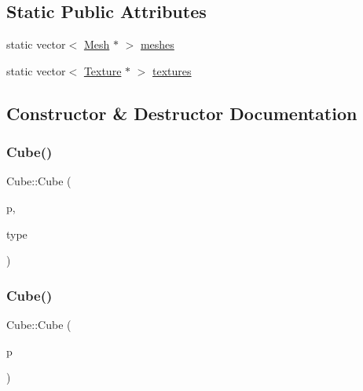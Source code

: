 \subsection*{Static Public Attributes}
\begin{DoxyCompactItemize}
\item 
static vector$<$ \mbox{\hyperlink{structMesh}{Mesh}} $\ast$ $>$ \mbox{\hyperlink{classCube_a4470b28c7fff28dd9058ea96307c1000}{meshes}}
\item 
static vector$<$ \mbox{\hyperlink{classTexture}{Texture}} $\ast$ $>$ \mbox{\hyperlink{classCube_a7c3516e41ce365ccad2d9bb9ed81ff10}{textures}}
\end{DoxyCompactItemize}


\subsection{Constructor \& Destructor Documentation}
\mbox{\label{classCube_a1609058c502ef5aa5d162809d156826b}} 
\subsubsection{\texorpdfstring{Cube()}{Cube()}\hspace{0.1cm}{\footnotesize\ttfamily [1/3]}}
{\footnotesize\ttfamily Cube\+::\+Cube (\begin{DoxyParamCaption}\item[{vec3}]{p,  }\item[{\mbox{\hyperlink{Cube_8hpp_ae2a13060ddab6f6437cc4d66a1f7c370}{Cube\+ID}}}]{type }\end{DoxyParamCaption})}

\mbox{\label{classCube_a8ac9a092c5f71dd72671e83d406474aa}} 
\subsubsection{\texorpdfstring{Cube()}{Cube()}\hspace{0.1cm}{\footnotesize\ttfamily [2/3]}}
{\footnotesize\ttfamily Cube\+::\+Cube (\begin{DoxyParamCaption}\item[{vec3}]{p }\end{DoxyParamCaption})}

\mbox{\label{classCube_a06f3d86fb63e3aad08623610aa3c17b4}} 
